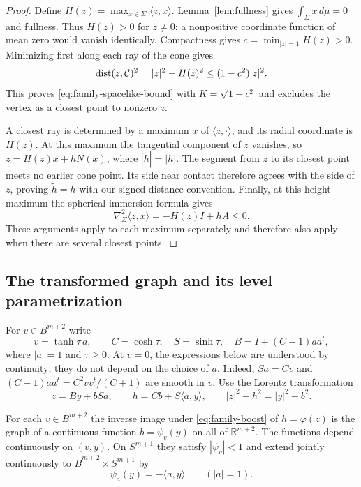 \begin{proof}
Define $H(z)=\max_{x\in\Sigma}\langle z,x\rangle$.
Lemma~\ref{lem:fullness} gives $\int_\Sigma x\,d\mu=0$ and fullness.
Thus $H(z)>0$ for $z\ne0$: a nonpositive coordinate function of mean
zero would vanish identically.  Compactness gives
$c=\min_{|z|=1}H(z)>0$.
Minimizing first along each ray of the cone gives
\[
 \operatorname{dist}(z,\mathcal C)^2=|z|^2-H(z)^2
 \le(1-c^2)|z|^2.
\]
This proves \eqref{eq:family-spacelike-bound} with
$K=\sqrt{1-c^2}$ and excludes the vertex as a closest point to nonzero
$z$.

A closest ray is determined by a maximum $x$ of
$\langle z,\cdot\rangle$, and its radial coordinate is $H(z)$.
At this maximum the tangential component of $z$ vanishes, so
$z=H(z)x+\widetilde hN(x)$, where $|\widetilde h|=|h|$.
The segment from $z$ to its closest point meets no earlier cone point.
Its side near contact therefore agrees with the side of $z$, proving
$\widetilde h=h$ with our signed-distance convention.
Finally, at this height maximum the spherical immersion formula gives
\[
 \nabla^2_\Sigma\langle z,x\rangle=-H(z)I+hA\le0.
\]
These arguments apply to each maximum separately and therefore also
apply when there are several closest points.
\end{proof}

\subsection{The transformed graph and its level parametrization}

For $v\in B^{m+2}$ write
\[
 v=\tanh\tau\,a,\qquad
 C=\cosh\tau,\quad S=\sinh\tau,\quad
 B=I+(C-1)aa^t,
\]
where $|a|=1$ and $\tau\ge0$.  At $v=0$, the expressions below are
understood by continuity; they do not depend on the choice of $a$.
Indeed, $Sa=Cv$ and
$(C-1)aa^t=C^2vv^t/(C+1)$ are smooth in $v$.
Use the Lorentz transformation
\begin{equation}\label{eq:family-boost}
 z=By+bSa,\qquad h=Cb+S\langle a,y\rangle,
 \qquad |z|^2-h^2=|y|^2-b^2.
\end{equation}

\begin{lemma}\label{lem:family-graph}
For each $v\in B^{m+2}$ the inverse image under
\eqref{eq:family-boost} of $h=\varphi(z)$ is the graph of a continuous
function $b=\psi_v(y)$ on all of $\mathbb R^{m+2}$.
The functions depend continuously on $(v,y)$.
On $S^{m+1}$ they satisfy $|\psi_v|<1$ and extend jointly continuously
to $\overline B^{m+2}\times S^{m+1}$ by
\begin{equation}\label{eq:family-boundary-graph}
 \psi_a(y)=-\langle a,y\rangle\qquad(|a|=1).
\end{equation}
\end{lemma}

